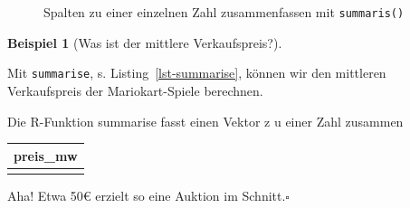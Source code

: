 \documentclass[
  a4paper,
  DIV=11]{scrreprt}
\newenvironment{Shaded}{\begin{snugshade}}{\end{snugshade}}
\newcommand{\AttributeTok}[1]{\textcolor[rgb]{0.40,0.45,0.13}{#1}}
\newcommand{\FunctionTok}[1]{\textcolor[rgb]{0.28,0.35,0.67}{#1}}
\newcommand{\NormalTok}[1]{\textcolor[rgb]{0.00,0.23,0.31}{#1}}
\newcommand{\OtherTok}[1]{\textcolor[rgb]{0.00,0.23,0.31}{#1}}
\theoremstyle{definition}
\theoremstyle{definition}
\newtheorem{example}{Beispiel}[chapter]
\theoremstyle{definition}
\theoremstyle{remark}
\begin{document}
\begin{figure}


\caption{\label{fig-summarise}Spalten zu einer einzelnen Zahl
zusammenfassen mit \texttt{summaris()}}

\end{figure}%

\begin{example}[Was ist der mittlere
Verkaufspreis?]\protect\hypertarget{exm-summarise}{}\label{exm-summarise}

Mit \texttt{summarise}, s. Listing~\ref{lst-summarise}, können wir den
mittleren Verkaufspreis der Mariokart-Spiele berechnen.

\begin{codelisting}

\caption{\label{lst-summarise}Die R-Funktion summarise fasst einen
Vektor z u einer Zahl zusammen}

\centering{

\begin{Shaded}
\begin{Highlighting}[]
\NormalTok{mariokart\_mittelwert }\OtherTok{\textless{}{-}} \FunctionTok{summarise}\NormalTok{(mariokart,}
                                  \AttributeTok{preis\_mw =} \FunctionTok{mean}\NormalTok{(total\_pr))}
\NormalTok{mariokart\_mittelwert}
\end{Highlighting}
\end{Shaded}

}

\end{codelisting}%

\begin{longtable}[]{@{}r@{}}
\toprule\noalign{}
preis\_mw \\
\midrule\noalign{}
\endhead
\bottomrule\noalign{}
\endlastfoot
50 \\
\end{longtable}

Aha! Etwa 50€ erzielt so eine Auktion im Schnitt.\(\square\)

\end{example}
\end{document}
